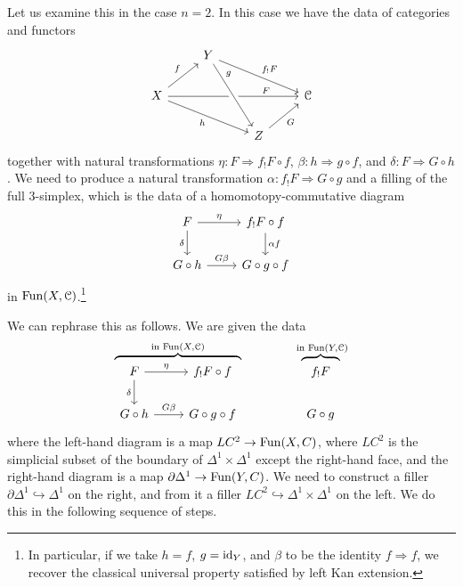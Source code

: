\documentclass[main.tex]{subfiles}
\begin{document}
Let us examine this in the case $n = 2$. In this case we have the data of categories and functors
\begin{equation*}
  \begin{tikzcd}
    & Y
    \arrow[drr, "f_{!}F"]
    \\
    X
    \arrow[drr, swap, "h"]
    \arrow[ur, "f"]
    \arrow[rrr, near end, "F"]
    &&& \category{C}
    \\
    && Z
    \arrow[ur, swap, "G"]
    \arrow[from=uul, crossing over, near start, "g"]
  \end{tikzcd}
\end{equation*}
together with natural transformations $\eta\colon F \Rightarrow f_{!}F \circ f$, $\beta\colon h \Rightarrow g \circ f$, and $\delta\colon F \Rightarrow G \circ h$. We need to produce a natural transformation $\alpha\colon f_{!}F \Rightarrow G \circ g$ and a filling of the full 3-simplex, which is the data of a homomotopy-commutative diagram
\begin{equation*}
  \begin{tikzcd}
    F
    \arrow[r, "\eta"]
    \arrow[d, swap, "\delta"]
    & f_{!}F \circ f
    \arrow[d, "\alpha f"]
    \\
    G \circ h
    \arrow[r, "G \beta"]
    & G \circ g \circ f
  \end{tikzcd}
\end{equation*}
in $\mathrm{Fun}(X, \mathcal{C})$.\footnote{In particular, if we take $h = f$, $g = \mathrm{id}_{Y}$, and $\beta$ to be the identity $f \Rightarrow f$, we recover the classical universal property satisfied by left Kan extension.}

We can rephrase this as follows. We are given the data
\begin{equation*}
  \overbrace{
  \begin{tikzcd}[ampersand replacement=\&]
    F
    \arrow[r, "\eta"]
    \arrow[d, swap, "\delta"]
    \& f_{!}F \circ f
    \\
    G \circ h
    \arrow[r, "G \beta"]
    \& G \circ g \circ f
  \end{tikzcd}}^{\text{in }\Fun(X, \category{C})}
  \qquad\qquad
  \overbrace{
  \begin{tikzcd}
    f_{!}F
    \\
    G \circ g
  \end{tikzcd}}^{\text{ in }\Fun(Y, \category{C})}
\end{equation*}
where the left-hand diagram is a map $LC^{2} \to \mathrm{Fun}(X, C)$, where $LC^{2}$ is the simplicial subset of the boundary of $\Delta^{1} \times \Delta^{1}$ except the right-hand face, and the right-hand diagram is a map $\partial \Delta^{1} \to \mathrm{Fun}(Y, C)$. We need to construct a filler $\partial \Delta^{1} \hookrightarrow \Delta^{1}$ on the right, and from it a filler $LC^{2} \hookrightarrow \Delta^{1} \times \Delta^{1}$ on the left. We do this in the following sequence of steps.
\end{document}
